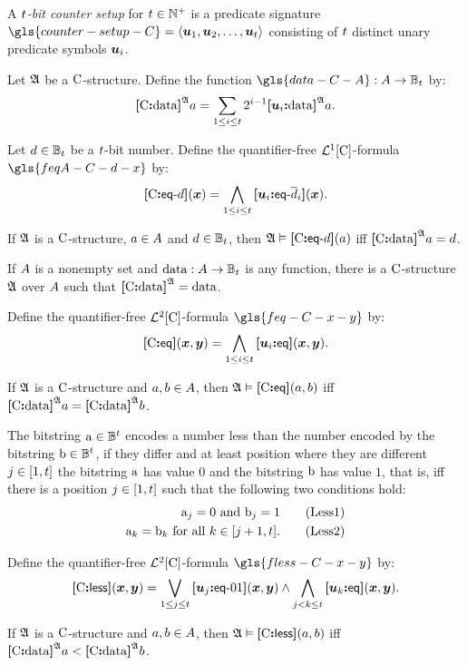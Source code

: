 A \emph{$t$-bit counter setup} for $t \in \mathbb{N}^{+}$ is a predicate
signature $\gls{counter-setup-C} = \seq{\suu1, \suu2, \dots, \suu\tbit}$
consisting of $t$ distinct unary predicate symbols $\bm{u}_{i}$.

\begin{definition}
Let $\mathfrak{A}$ be a ${\mathrm{C}}$-structure. Define the function
$\gls{data-C-A} : \domA \to \tBitnums\tbit$ by:
\[
  {\bm{[}{\mathrm{C}}\mathord{\bm{:}}\mathrm{data}\bm{]}}^{\mathfrak{A}}a = \sum_{1 \leq i \leq t} 2^{i-1} 
  {\bm{[}\bm{u}_{i}\mathord{\bm{:}}\mathrm{data}\bm{]}}^{\mathfrak{A}}a.
\]
\end{definition}
\begin{definition}
Let $d \in \mathbb{B}_{t}$ be a $t$-bit number. Define the
quantifier-free $\mathcal{L}^{1}[{\mathrm{C}}]$-formula $\gls{feqA-C-d-x}$ by:
\[
  {\bm{[}{\mathrm{C}}\mathord{\bm{:}}\mathsf{eq}{\hbox{-}}d\bm{]}}(\bm{x}) = \bigwedge_{1 \leq i \leq t}
  {\bm{[}\bm{u}_{i}\mathord{\bm{:}}\mathsf{eq}{\hbox{-}}\overline{d}_i\bm{]}}(\bm{x}).
\]
\end{definition}
If $\mathfrak{A}$ is a ${\mathrm{C}}$-structure, $a \in A$ and $d \in
\mathbb{B}_{t}$, then $\mathfrak{A} \vDash {\bm{[}{\mathrm{C}}\mathord{\bm{:}}\mathsf{eq}{\hbox{-}}d\bm{]}}(a)$ iff ${\bm{[}{\mathrm{C}}\mathord{\bm{:}}\mathrm{data}\bm{]}}^{\mathfrak{A}} a =
d$.

If $A$ is a nonempty set and $\operatorname{data} : A \to \mathbb{B}_{t}$ is any
function, there is a ${\mathrm{C}}$-structure $\mathfrak{A}$ over $A$ such that
${\bm{[}{\mathrm{C}}\mathord{\bm{:}}\mathrm{data}\bm{]}}^{\mathfrak{A}} = \operatorname{data}$.

\begin{definition}
Define the quantifier-free $\mathcal{L}^{2}[{\mathrm{C}}]$-formula $\gls{feq-C-x-y}$ by:
\[
  {\bm{[}{\mathrm{C}}\mathord{\bm{:}}\mathsf{eq}\bm{]}}(\bm{x},\bm{y}) = \bigwedge_{1 \leq i \leq t} {\bm{[}\bm{u}_{i}\mathord{\bm{:}}\mathsf{eq}\bm{]}}(\bm{x},\bm{y}).
\]
\end{definition}
If $\mathfrak{A}$ is a ${\mathrm{C}}$-structure and $a, b \in A$,
then $\mathfrak{A} \vDash {\bm{[}{\mathrm{C}}\mathord{\bm{:}}\mathsf{eq}\bm{]}}(a, b)$ iff ${\bm{[}{\mathrm{C}}\mathord{\bm{:}}\mathrm{data}\bm{]}}^{\mathfrak{A}}a = {\bm{[}{\mathrm{C}}\mathord{\bm{:}}\mathrm{data}\bm{]}}^{\mathfrak{A}}b$.

The bitstring $\mathrm{a} \in \mathbb{B}^{t}$ encodes a number less than the
number encoded by the bitstring $\mathrm{b} \in \mathbb{B}^{t}$, if they differ
and at least position where they are different $j \in [1,t]$ the bitstring
$\mathrm{a}$ has value $0$ and the bitstring $\mathrm{b}$ has value $1$, that is, iff
there is a position $j \in [1,t]$ such that the following two conditions
hold:
\begin{align}
  \mathrm{a}_j = 0 \text{ and } \mathrm{b}_j = 1 \tag{Less1}\label{Less1} \\
  \mathrm{a}_k = \mathrm{b}_k \text{ for all } k \in [j+1,t].
  \tag{Less2}\label{Less2}
\end{align}
\begin{definition}
Define the quantifier-free $\mathcal{L}^{2}[{\mathrm{C}}]$-formula $\gls{fless-C-x-y}$ by:
\[
  {\bm{[}{\mathrm{C}}\mathord{\bm{:}}\mathsf{less}\bm{]}}(\bm{x},\bm{y}) = \bigvee_{1 \leq j \leq t} {\bm{[}\bm{u}_{j}\mathord{\bm{:}}\mathsf{eq}{\hbox{-}}01\bm{]}}(\bm{x},\bm{y})
  \land \bigwedge_{j < k \leq t} {\bm{[}\bm{u}_{k}\mathord{\bm{:}}\mathsf{eq}\bm{]}}(\bm{x},\bm{y}).
\]
\end{definition}
If $\mathfrak{A}$ is a ${\mathrm{C}}$-structure and $a, b \in A$,
then $\mathfrak{A} \vDash {\bm{[}{\mathrm{C}}\mathord{\bm{:}}\mathsf{less}\bm{]}}(a, b)$ iff
${\bm{[}{\mathrm{C}}\mathord{\bm{:}}\mathrm{data}\bm{]}}^{\mathfrak{A}}a < {\bm{[}{\mathrm{C}}\mathord{\bm{:}}\mathrm{data}\bm{]}}^{\mathfrak{A}}b$.

